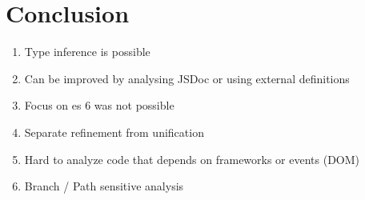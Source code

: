 \section{Conclusion}

\begin{enumerate}
	\item Type inference is possible
	\item Can be improved by analysing JSDoc or using external definitions
	\item Focus on es 6 was not possible
	\item Separate refinement from unification
	\item Hard to analyze code that depends on frameworks or events (DOM)
	\item Branch / Path sensitive analysis
\end{enumerate}